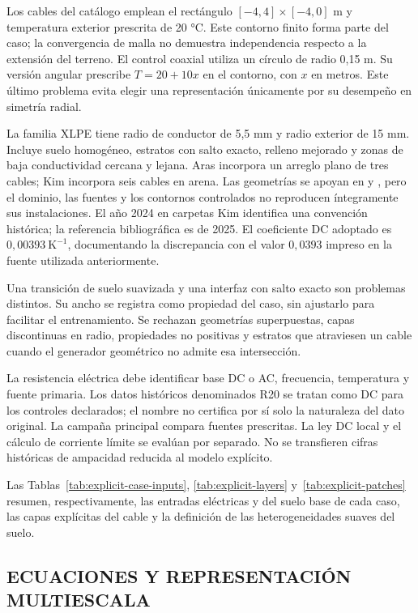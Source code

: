 Los cables del catálogo emplean el rectángulo $[-4,4]\times[-4,0]$ m y temperatura exterior prescrita de 20 °C. Este contorno finito forma parte del caso; la convergencia de malla no demuestra independencia respecto a la extensión del terreno. El control coaxial utiliza un círculo de radio 0,15 m. Su versión angular prescribe $T=20+10x$ en el contorno, con $x$ en metros. Este último problema evita elegir una representación únicamente por su desempeño en simetría radial.

La familia XLPE tiene radio de conductor de 5,5 mm y radio exterior de 15 mm. Incluye suelo homogéneo, estratos con salto exacto, relleno mejorado y zonas de baja conductividad cercana y lejana. Aras incorpora un arreglo plano de tres cables; Kim incorpora seis cables en arena. Las geometrías se apoyan en \textcite{aras2005} y \textcite{kim2025}, pero el dominio, las fuentes y los contornos controlados no reproducen íntegramente sus instalaciones. El año 2024 en carpetas Kim identifica una convención histórica; la referencia bibliográfica es de 2025. El coeficiente DC adoptado es $0,00393\ \mathrm{K}^{-1}$, documentando la discrepancia con el valor $0,0393$ impreso en la fuente utilizada anteriormente.

Una transición de suelo suavizada y una interfaz con salto exacto son problemas distintos. Su ancho se registra como propiedad del caso, sin ajustarlo para facilitar el entrenamiento. Se rechazan geometrías superpuestas, capas discontinuas en radio, propiedades no positivas y estratos que atraviesen un cable cuando el generador geométrico no admite esa intersección.

La resistencia eléctrica debe identificar base DC o AC, frecuencia, temperatura y fuente primaria. Los datos históricos denominados R20 se tratan como DC para los controles declarados; el nombre no certifica por sí solo la naturaleza del dato original. La campaña principal compara fuentes prescritas. La ley DC local y el cálculo de corriente límite se evalúan por separado. No se transfieren cifras históricas de ampacidad reducida al modelo explícito.

Las Tablas~\ref{tab:explicit-case-inputs}, \ref{tab:explicit-layers} y~\ref{tab:explicit-patches} resumen, respectivamente, las entradas eléctricas y del suelo base de cada caso, las capas explícitas del cable y la definición de las heterogeneidades suaves del suelo.



\subsection{ECUACIONES Y REPRESENTACIÓN MULTIESCALA}

